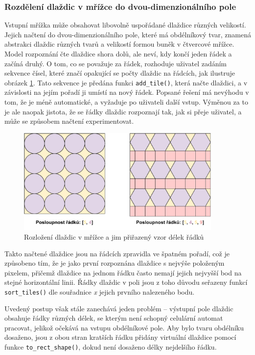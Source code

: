 \subsubsection*{Rozdělení dlaždic v mřížce do dvou-dimenzionálního pole}
Vstupní mřížka může obsahovat libovolně uspořádané dlaždice různých velikostí. Jejich načtení do dvou-dimenzionálního pole, které má obdélníkový tvar, znamená abstrakci dlaždic různých tvarů a velikostí formou buněk v čtvercové mřížce. Model rozpoznání čte dlaždice shora dolů, ale neví, kdy končí jeden řádek a začíná druhý. O tom, co se považuje za řádek, rozhoduje uživatel zadáním sekvence čísel, které značí opakující se počty dlaždic na řádcích, jak ilustruje obrázek \ref{fig:SekvenceRadku}. Tato sekvence je předána funkci \verb|add_tile()|, která načte dlaždici, a v závislosti na jejím pořadí ji umístí na nový řádek. Popsané řešení má nevýhodu v tom, že je méně automatické, a vyžaduje po uživateli další vstup. Výměnou za to je ale naopak jistota, že se řádky dlaždic rozpoznají tak, jak si přeje uživatel, a může se způsobem načtení experimentovat.

\begin{figure}[H]
    \centering
    \includegraphics[width=0.9\textwidth]{obrazky-figures/SekvenceRadku.pdf}
    \caption{Rozložení dlaždic v mřížce a jim přiřazený vzor délek řádků}
    \label{fig:SekvenceRadku}
\end{figure}

Takto načtené dlaždice jsou na řádcích zpravidla ve špatném pořadí, což je způsobeno tím, že je jako první rozpoznána dlaždice s nejvýše položeným pixelem, přičemž dlaždice na jednom řádku často nemají jejich nejvyšší bod na stejné horizontální linii. Řádky dlaždic v poli jsou z toho důvodu seřazeny funkcí \verb|sort_tiles()| dle souřadnice \emph{x} jejich prvního nalezeného bodu. 

Uvedený postup však stále zanechává jeden problém -- výstupní pole dlaždic obsahuje řádky různých délek, se kterým není schopný celulární automat pracovat, jelikož očekává na vstupu obdélníkové pole. Aby bylo tvaru obdélníku dosaženo, jsou z obou stran kratších řádku přidány virtuální dlaždice pomocí funkce \verb|to_rect_shape()|, dokud není dosaženo délky nejdelšího řádku.

